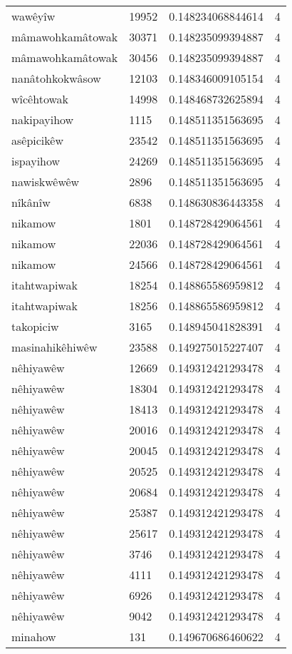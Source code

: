 \begin{longtable}{llll}
wawêyîw & 19952 & 0.148234068844614 & 4 \\
mâmawohkamâtowak & 30371 & 0.148235099394887 & 4 \\
mâmawohkamâtowak & 30456 & 0.148235099394887 & 4 \\
nanâtohkokwâsow & 12103 & 0.148346009105154 & 4 \\
wîcêhtowak & 14998 & 0.148468732625894 & 4 \\
nakipayihow & 1115 & 0.148511351563695 & 4 \\
asêpicikêw & 23542 & 0.148511351563695 & 4 \\
ispayihow & 24269 & 0.148511351563695 & 4 \\
nawiskwêwêw & 2896 & 0.148511351563695 & 4 \\
nîkânîw & 6838 & 0.148630836443358 & 4 \\
nikamow & 1801 & 0.148728429064561 & 4 \\
nikamow & 22036 & 0.148728429064561 & 4 \\
nikamow & 24566 & 0.148728429064561 & 4 \\
itahtwapiwak & 18254 & 0.148865586959812 & 4 \\
itahtwapiwak & 18256 & 0.148865586959812 & 4 \\
takopiciw & 3165 & 0.148945041828391 & 4 \\
masinahikêhiwêw & 23588 & 0.149275015227407 & 4 \\
nêhiyawêw & 12669 & 0.149312421293478 & 4 \\
nêhiyawêw & 18304 & 0.149312421293478 & 4 \\
nêhiyawêw & 18413 & 0.149312421293478 & 4 \\
nêhiyawêw & 20016 & 0.149312421293478 & 4 \\
nêhiyawêw & 20045 & 0.149312421293478 & 4 \\
nêhiyawêw & 20525 & 0.149312421293478 & 4 \\
nêhiyawêw & 20684 & 0.149312421293478 & 4 \\
nêhiyawêw & 25387 & 0.149312421293478 & 4 \\
nêhiyawêw & 25617 & 0.149312421293478 & 4 \\
nêhiyawêw & 3746 & 0.149312421293478 & 4 \\
nêhiyawêw & 4111 & 0.149312421293478 & 4 \\
nêhiyawêw & 6926 & 0.149312421293478 & 4 \\
nêhiyawêw & 9042 & 0.149312421293478 & 4 \\
minahow & 131 & 0.149670686460622 & 4 \\

\end{longtable}
